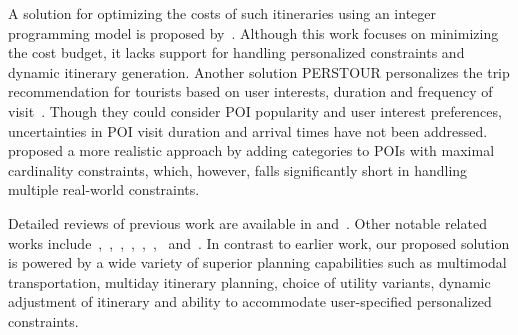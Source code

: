 A solution for optimizing the costs of such itineraries using an integer programming model is proposed by~\cite{rambha2024optimized}. Although this work focuses on minimizing the cost budget, it lacks support for handling personalized constraints and dynamic itinerary generation. Another solution PERSTOUR personalizes the trip recommendation for tourists based on user interests, duration and frequency of visit~\cite{lim2018personalized}. Though they could consider POI popularity and user interest preferences, uncertainties in POI visit duration and arrival times have not been addressed. \cite{bolzoni2014efficient} proposed a more realistic approach by adding categories to POIs with maximal cardinality constraints, which, however, falls significantly short in handling multiple real-world constraints.

Detailed reviews of previous work are available in\cite{gavalas2014survey} and~\cite{sylejmani2011survey}.
Other notable related works include~\cite{zheng2021novel},~\cite{yu2017mining},~\cite{jiaoman2018travel},~\cite{sylejmani2017planning},~\cite{zografos2008algorithms},~\cite{rani2018development},~\cite{yu2014optimal} and~\cite{arora2024itinerary}. In contrast to earlier work, our proposed \trip solution is powered by a wide variety of superior planning capabilities such as multimodal transportation, multiday itinerary planning, choice of utility variants, dynamic adjustment of itinerary and ability to accommodate user-specified personalized constraints.